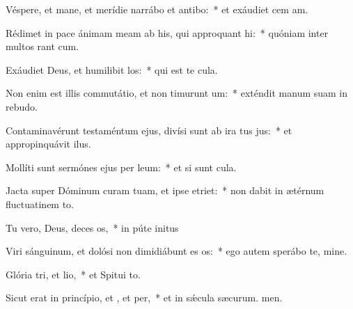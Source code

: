 \item Véspere, et mane, et merídie narrábo et antibo:~* et exáudiet cem am.
\item Rédimet in pace ánimam meam ab his, qui approquant hi:~* quóniam inter multos rant cum.
\item Exáudiet Deus, et humilibit los:~* qui est te cula.
\item Non enim est illis commutátio, et non timurunt um:~* exténdit manum suam in rebudo.
\item Contaminavérunt testaméntum ejus, divísi sunt ab ira tus jus:~* et appropinquávit  ilus.
\item Mollíti sunt sermónes ejus per leum:~* et si sunt cula.
\item Jacta super Dóminum curam tuam, et ipse  etriet:~* non dabit in ætérnum fluctuatinem to.
\item Tu vero, Deus, deces os,~* in púte initus
\item Viri sánguinum, et dolósi non dimidiábunt es os:~* ego autem sperábo  te, mine.
\item Glória tri, et lio,~* et Spitui to.
\item Sicut erat in princípio, et , et per,~* et in sǽcula sæcurum. men.

